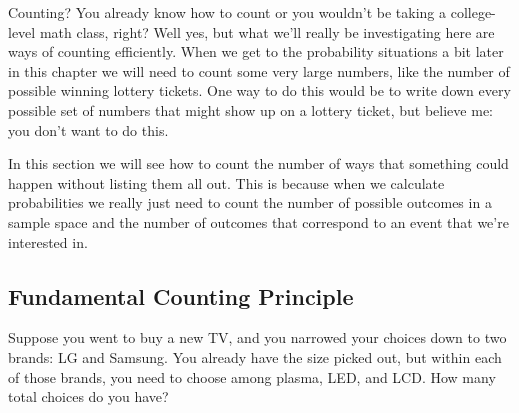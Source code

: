 \setcounter{ExampleCounter}{1}

Counting? You already know how to count or you wouldn't be taking a college-level math
class, right? Well yes, but what we'll really be investigating here are ways of counting
efficiently. When we get to the probability situations a bit later in this chapter we will need
to count some very large numbers, like the number of possible winning lottery tickets. One
way to do this would be to write down every possible set of numbers that might show up on a
lottery ticket, but believe me: you don't want to do this.

In this section we will see how to count the number of ways that something could happen without listing them all out.  This is because when we calculate probabilities we really just need to count the number of possible outcomes in a sample space and the number of outcomes that correspond to an event that we're interested in.

\subsection{Fundamental Counting Principle}
Suppose you went to buy a new TV, and you narrowed your choices down to two brands: LG and Samsung.  You already have the size picked out, but within each of those brands, you need to choose among plasma, LED, and LCD.  How many total choices do you have?

\begin{center}
\end{center}


